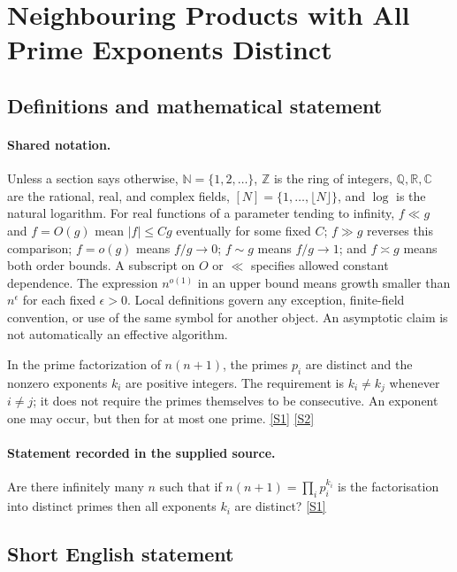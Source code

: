 \documentclass[11pt,a4paper]{article}
\newcommand{\N}{\mathbb{N}}
\newcommand{\Z}{\mathbb{Z}}
\newcommand{\Q}{\mathbb{Q}}
\newcommand{\R}{\mathbb{R}}
\newcommand{\C}{\mathbb{C}}
\newcommand{\sref}[2]{\hyperlink{source:#1:#2}{[S#2]}}
\begin{document}
\section{Neighbouring Products with All Prime Exponents Distinct}\label{statement}


\subsection{Definitions and mathematical statement}

\paragraph{Shared notation.}Unless a section says otherwise, $\N=\{1,2,\ldots\}$,
$\Z$ is the ring of integers, $\Q,\R,\C$ are the rational, real, and complex
fields, $[N]=\{1,\ldots,\lfloor N\rfloor\}$, and $\log$ is the natural
logarithm. For real functions of a parameter tending to infinity,
$f\ll g$ and $f=O(g)$ mean $|f|\leq Cg$ eventually for some fixed $C$;
$f\gg g$ reverses this comparison; $f=o(g)$ means $f/g\to0$;
$f\sim g$ means $f/g\to1$; and $f\asymp g$ means both order bounds.
A subscript on $O$ or $\ll$ specifies allowed constant dependence.
The expression $n^{o(1)}$ in an upper bound means growth smaller than
$n^\epsilon$ for each fixed $\epsilon>0$. Local definitions govern any
exception, finite-field convention, or use of the same symbol for another
object. An asymptotic claim is not automatically an effective algorithm.



In the prime factorization of $n(n+1)$, the primes $p_i$ are distinct and the nonzero exponents $k_i$ are positive integers. The requirement is $k_i\ne k_j$ whenever $i\ne j$; it does not require the primes themselves to be consecutive. An exponent one may occur, but then for at most one prime. \sref{statement}{1} \sref{statement}{2}

\paragraph{Statement recorded in the supplied source.}
Are there infinitely many $n$ such that if $ n(n+1) = \prod_i p_i^{k_i} $ is the factorisation into distinct primes then all exponents $k_i$ are distinct? \sref{statement}{1}

\subsection{Short English statement}
\end{document}
